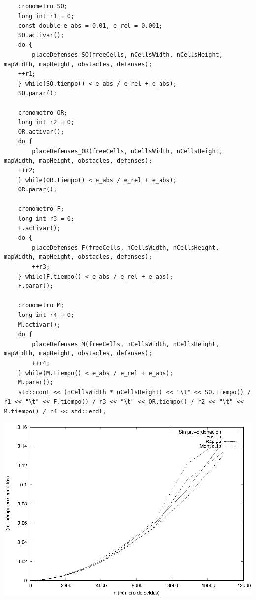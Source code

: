 \begin{lstlisting}
    cronometro SO;
    long int r1 = 0;
    const double e_abs = 0.01, e_rel = 0.001;
    SO.activar();
    do {
        placeDefenses_SO(freeCells, nCellsWidth, nCellsHeight, mapWidth, mapHeight, obstacles, defenses);
	++r1;
    } while(SO.tiempo() < e_abs / e_rel + e_abs);
    SO.parar();

    cronometro OR;
    long int r2 = 0;
    OR.activar();
    do {
        placeDefenses_OR(freeCells, nCellsWidth, nCellsHeight, mapWidth, mapHeight, obstacles, defenses);
	++r2;
    } while(OR.tiempo() < e_abs / e_rel + e_abs);
    OR.parar();

    cronometro F;
    long int r3 = 0;
    F.activar();
    do {
        placeDefenses_F(freeCells, nCellsWidth, nCellsHeight, mapWidth, mapHeight, obstacles, defenses);
	    ++r3;
    } while(F.tiempo() < e_abs / e_rel + e_abs);
    F.parar();
    
    cronometro M;
    long int r4 = 0;
    M.activar();
    do {
        placeDefenses_M(freeCells, nCellsWidth, nCellsHeight, mapWidth, mapHeight, obstacles, defenses);
	    ++r4;
    } while(M.tiempo() < e_abs / e_rel + e_abs);
    M.parar();
    std::cout << (nCellsWidth * nCellsHeight) << "\t" << SO.tiempo() / r1 << "\t" << F.tiempo() / r3 << "\t" << OR.tiempo() / r2 << "\t" << M.tiempo() / r4 << std::endl;
\end{lstlisting}
\begin{center}
\includegraphics[scale=0.9]{graphic.eps} 
\end{center}